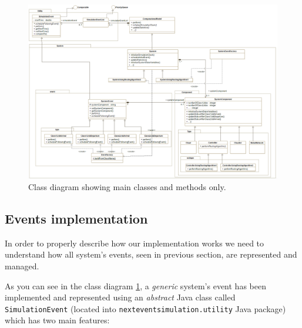 \documentclass[10pt,a4paper]{article}
\begin{document}
\begin{figure}[H]
\includegraphics[width=\textwidth]{ClassDiagram}
\centering
\caption{Class diagram showing main classes and methods only.}

\label{fig:ClassDiagram}

\end{figure}


\subsection{Events implementation}

In order to properly describe how our implementation works we need to understand how all system's events, seen in previous section, are represented and managed.

As you can see in the class diagram \ref{fig:ClassDiagram}, a \textit{generic} system's event has been implemented and represented using an \textit{abstract} Java class called \texttt{SimulationEvent} (located into \texttt{nexteventsimulation.utility} Java package) which has two main features:
\end{document}
